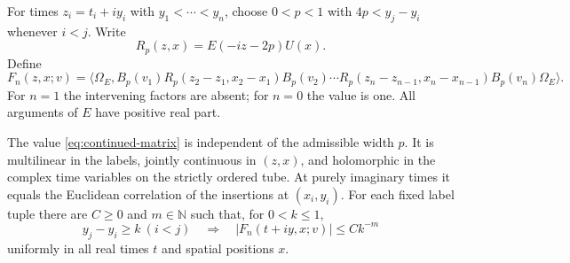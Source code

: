 For times $z_i=t_i+iy_i$ with $y_1<\cdots<y_n$, choose $0<p<1$ with
$4p<y_j-y_i$ whenever $i<j$. Write
\[
 R_p(z,x)=E(-iz-2p)U(x).
\]
Define
\begin{equation}\label{eq:continued-matrix}
 F_n(z,x;v)=\langle\Omega_E,
 B_p(v_1)R_p(z_2-z_1,x_2-x_1)B_p(v_2)\cdots
 R_p(z_n-z_{n-1},x_n-x_{n-1})B_p(v_n)\Omega_E\rangle.
\end{equation}
For $n=1$ the intervening factors are absent; for $n=0$ the value is one.
All arguments of $E$ have positive real part.

\begin{lemma}\label{lem:continued-matrix}
The value \eqref{eq:continued-matrix} is independent of the admissible width
$p$. It is multilinear in the labels, jointly continuous in $(z,x)$, and
holomorphic in the complex time variables on the strictly ordered tube.
At purely imaginary times it equals the Euclidean correlation of the
insertions at $(x_i,y_i)$. For each fixed label tuple there are $C\geq0$ and
$m\in\mathbb N$ such that, for $0<k\leq1$,
\begin{equation}\label{eq:gap-power}
 y_j-y_i\geq k\ (i<j)\quad\Longrightarrow\quad
 |F_n(t+iy,x;v)|\leq Ck^{-m}
\end{equation}
uniformly in all real times $t$ and spatial positions $x$.
\end{lemma}
